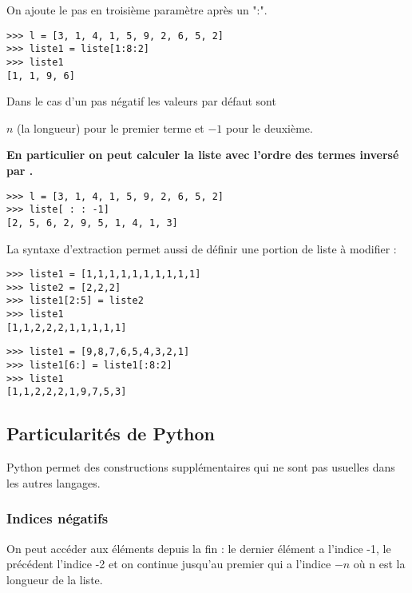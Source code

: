 On ajoute le pas en troisième paramètre après un ":".
\begin{lstlisting}
>>> l = [3, 1, 4, 1, 5, 9, 2, 6, 5, 2]
>>> liste1 = liste[1:8:2]
>>> liste1
[1, 1, 9, 6]
\end{lstlisting}

Dans le cas d'un pas négatif les valeurs par défaut sont 

$n$ (la longueur) pour le premier terme et $-1$ pour le deuxième. 

{\bf En particulier on peut calculer la liste avec l'ordre des termes inversé par \type[ : : -1].}
\begin{lstlisting}
>>> l = [3, 1, 4, 1, 5, 9, 2, 6, 5, 2]
>>> liste[ : : -1]
[2, 5, 6, 2, 9, 5, 1, 4, 1, 3]
\end{lstlisting}
La syntaxe d'extraction permet aussi de définir une portion de liste à modifier :
\begin{lstlisting}
>>> liste1 = [1,1,1,1,1,1,1,1,1,1]
>>> liste2 = [2,2,2]
>>> liste1[2:5] = liste2
>>> liste1
[1,1,2,2,2,1,1,1,1,1]
\end{lstlisting}
\begin{lstlisting}
>>> liste1 = [9,8,7,6,5,4,3,2,1]
>>> liste1[6:] = liste1[:8:2]
>>> liste1
[1,1,2,2,2,1,9,7,5,3]
\end{lstlisting}
\subsection{Particularités de Python}
Python permet des constructions supplémentaires qui ne sont pas usuelles dans les autres langages.
\subsubsection{Indices négatifs}
On peut accéder aux éléments depuis la fin : le dernier élément a l'indice -1, 
le précédent l'indice -2 et on continue jusqu'au premier qui a l'indice $-n$ où n est la longueur de la liste. 

